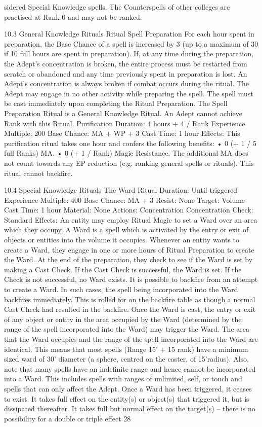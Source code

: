 \documentclass[a4paper]{article}
\begin{document}
\begin{multicols}{3}
sidered Special Knowledge spells. The Counterspells of other colleges are practised at Rank 0 and
may not be ranked.

10.3 General Knowledge Rituals
Ritual Spell Preparation
For each hour spent in preparation, the Base
Chance of a spell is increased by 3 (up to a maximum of 30 if 10 full hours are spent in preparation). If, at any time during the preparation, the
Adept’s concentration is broken, the entire process
must be restarted from scratch or abandoned and
any time previously spent in preparation is lost. An
Adept’s concentration is always broken if combat
occurs during the ritual. The Adept may engage in
no other activity while preparing the spell. The
spell must be cast immediately upon completing
the Ritual Preparation. The Spell Preparation Ritual is a General Knowledge Ritual. An Adept
cannot achieve Rank with this Ritual.
Purification
Duration: 4 hours + 4 / Rank
Experience Multiple: 200
Base Chance: MA + WP + 3%
Cast Time: 1 hour
Effects: This purification ritual takes one hour and
confers the following benefits:
• 0 (+ 1 / 5 full Ranks) MA.
• 0 (+ 1 / Rank) Magic Resistance.
The additional MA does not count towards any EP
reduction (e.g. ranking general spells or rituals).
This ritual cannot backfire.

10.4 Special Knowledge Rituals
The Ward Ritual
Duration: Until triggered
Experience Multiple: 400
Base Chance: MA + 3%
Resist: None
Target: Volume
Cast Time: 1 hour
Material: None
Actions: Concentration
Concentration Check: Standard
Effects: An entity may employ Ritual Magic to set
a Ward over an area which they occupy.
A Ward is a spell which is activated by the entry or
exit of objects or entities into the volume it occupies. Whenever an entity wants to create a Ward,
they engage in one or more hours of Ritual Preparation to create the Ward. At the end of the preparation, they check to see if the Ward is set by making a Cast Check. If the Cast Check is successful,
the Ward is set. If the Check is not successful, no
Ward exists.
It is possible to backfire from an attempt to create a
Ward. In such cases, the spell being incorporated
into the Ward backfires immediately. This is rolled
for on the backfire table as though a normal Cast
Check had resulted in the backfire.
Once the Ward is cast, the entry or exit of any
object or entity in the area occupied by the Ward
(determined by the range of the spell incorporated
into the Ward) may trigger the Ward. The area that
the Ward occupies and the range of the spell incorporated into the Ward are identical. This means
that most spells (Range 15’ + 15 rank) have a
minimum sized ward of
30’ diameter (a sphere, centred on the caster, of
15’radius). Also, note that many spells have an
indefinite range and hence cannot be incorporated
into a Ward. This includes spells with ranges of
unlimited, self, or touch and spells that can only
affect the Adept. Once a Ward has been triggered,
it ceases to exist. It takes full effect on the entity(s)
or object(s) that triggered it, but is dissipated thereafter. It takes full but normal effect on the target(s)
– there is no possibility for a double or triple effect
28


\end{multicols}
\end{document}
